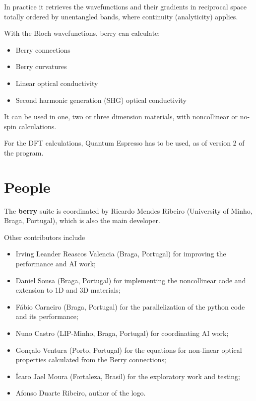 \documentclass[a4paper,12pt]{report}
\begin{document}
In practice it retrieves the wavefunctions and their gradients in reciprocal space totally ordered
by unentangled bands, where continuity (analyticity) applies.

With the Bloch wavefunctions, berry can calculate:
\begin{itemize}
  \item Berry connections
  \item Berry curvatures
  \item Linear optical conductivity
  \item Second harmonic generation (SHG) optical conductivity
\end{itemize}

It can be used in one, two or three dimension materials, with noncollinear or no-spin calculations.

For the DFT calculations, {\sc Quantum Espresso}\cite{Giannozzi2009,Giannozzi2017} has to be used,
as of version 2 of the program.




\newpage
\section{People}

The \textbf{berry} suite is coordinated by Ricardo Mendes Ribeiro (University of Minho, Braga, Portugal),
which is also the main developer.\medskip

Other contributors include
\begin{itemize}
 \item Irving Leander Reascos Valencia (Braga, Portugal) for improving the performance
 and AI work;
 \item Daniel Sousa (Braga, Portugal) for implementing the noncollinear code
 and extension to 1D and 3D materials;
 \item Fábio Carneiro (Braga, Portugal) for the parallelization of the python code
 and its performance;
 \item Nuno Castro (LIP-Minho, Braga, Portugal) for coordinating AI work;
 \item Gonçalo Ventura (Porto, Portugal) for the equations for non-linear optical properties
 calculated from the Berry connections;
 \item Ícaro Jael Moura (Fortaleza, Brasil) for the exploratory work and testing;
 \item Afonso Duarte Ribeiro, author of the logo.
\end{itemize}
\end{document}
